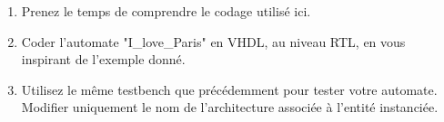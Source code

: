 \documentclass[a4paper,11pt]{article}
\begin{document}
%   

\begin{enumerate}
  \item Prenez le temps de comprendre le codage utilisé ici.
  \item Coder l'automate "I\_love\_Paris" en VHDL, au niveau RTL, en vous inspirant de l'exemple donné.
  \item Utilisez le même testbench que précédemment pour tester votre automate. Modifier uniquement le nom de l'architecture associée à l'entité instanciée.
\end{enumerate}
\end{document}
